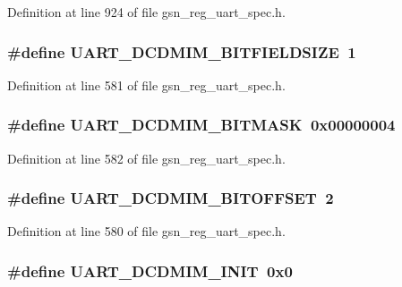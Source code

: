 Definition at line 924 of file gsn\_\-reg\_\-uart\_\-spec.h.

\hypertarget{a00575_a24204eee4bbda19ae4ca00e626f6c0dd}{
\subsubsection[{UART\_\-DCDMIM\_\-BITFIELDSIZE}]{\setlength{\rightskip}{0pt plus 5cm}\#define UART\_\-DCDMIM\_\-BITFIELDSIZE~1}}
\label{a00575_a24204eee4bbda19ae4ca00e626f6c0dd}


Definition at line 581 of file gsn\_\-reg\_\-uart\_\-spec.h.

\hypertarget{a00575_a1fcdab7ab856ea6c133b2e2d59afe7a0}{
\subsubsection[{UART\_\-DCDMIM\_\-BITMASK}]{\setlength{\rightskip}{0pt plus 5cm}\#define UART\_\-DCDMIM\_\-BITMASK~0x00000004}}
\label{a00575_a1fcdab7ab856ea6c133b2e2d59afe7a0}


Definition at line 582 of file gsn\_\-reg\_\-uart\_\-spec.h.

\hypertarget{a00575_a3b3b37dcaf687aba9115ae5c9fe1ad75}{
\subsubsection[{UART\_\-DCDMIM\_\-BITOFFSET}]{\setlength{\rightskip}{0pt plus 5cm}\#define UART\_\-DCDMIM\_\-BITOFFSET~2}}
\label{a00575_a3b3b37dcaf687aba9115ae5c9fe1ad75}


Definition at line 580 of file gsn\_\-reg\_\-uart\_\-spec.h.

\hypertarget{a00575_a6142c696b9c75f3e0b1ef3f3fab506cc}{
\subsubsection[{UART\_\-DCDMIM\_\-INIT}]{\setlength{\rightskip}{0pt plus 5cm}\#define UART\_\-DCDMIM\_\-INIT~0x0}}
\label{a00575_a6142c696b9c75f3e0b1ef3f3fab506cc}


